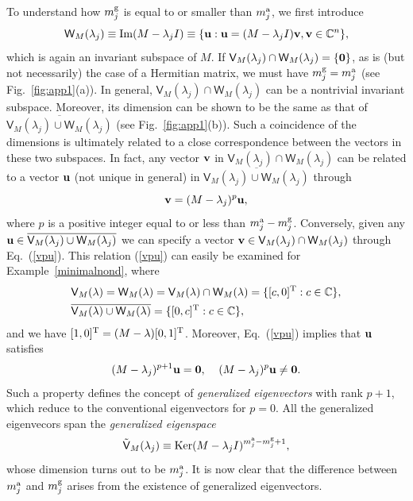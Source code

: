 \documentclass{tADP2e}
\theoremstyle{plain}
\theoremstyle{plain}
\theoremstyle{definition}
\begin{document}
\begin{appendices}
To understand how $m^{\rm g}_j$ is equal to or smaller than $m^{\rm a}_j$, we first introduce
\begin{equation}
\textsf{W}_M(\lambda_j)\equiv{\rm Im}(M-\lambda_jI)\equiv\{\bold{u}:\bold{u}=(M-\lambda_jI)\bold{v},\bold{v}\in\mathbb{C}^n\},
\label{WM}
\end{equation}
which is again an invariant subspace of $M$. If $\textsf{V}_M(\lambda_j)\cap \textsf{W}_M(\lambda_j)=\{\bold{0}\}$, as is (but not necessarily) the case of a Hermitian matrix, we must have $m^{\rm g}_j=m^{\rm a}_j$ (see Fig.~\ref{fig:app1}(a)).  In general, $\textsf{V}_M(\lambda_j)\cap \textsf{W}_M(\lambda_j)$ can be a nontrivial invariant subspace. Moreover, its dimension can be shown to be the same as that of $\overline{\textsf{V}_M(\lambda_j)\cup \textsf{W}_M(\lambda_j)}$ (see Fig.~\ref{fig:app1}(b)). %
Such a coincidence of the dimensions is ultimately related to a close correspondence between the vectors in these two subspaces. In fact, any vector $\bold{v}$ in $\textsf{V}_M(\lambda_j)\cap \textsf{W}_M(\lambda_j)$ can be related to a vector $\bold{u}$ (not unique in general) in $\overline{\textsf{V}_M(\lambda_j)\cup \textsf{W}_M(\lambda_j)}$ through
\begin{equation}
\bold{v}=(M-\lambda_j)^p\bold{u},
\label{vpu}
\end{equation}
where $p$ is a positive integer equal to or less than $m^{\rm a}_j-m^{\rm g}_j$. Conversely, given any $\bold{u}\in \overline{\textsf{V}_M(\lambda_j)\cup \textsf{W}_M(\lambda_j)}$ we can specify a vector $\bold{v}\in \textsf{V}_M(\lambda_j)\cap \textsf{W}_M(\lambda_j)$ through Eq.~(\ref{vpu}). This relation (\ref{vpu}) can easily be examined for Example~\ref{minimalnond}, where 
\begin{equation}
\begin{split}
&\textsf{V}_M(\lambda)=\textsf{W}_M(\lambda)=\textsf{V}_M(\lambda)\cap\textsf{W}_M(\lambda)=\{[c,0]^{\rm T}:c\in\mathbb{C}\}, \\
&\overline{\textsf{V}_M(\lambda)\cup\textsf{W}_M(\lambda)}=\{[0,c]^{\rm T}:c\in\mathbb{C}\},
\end{split}
\end{equation}
and we have $[1,0]^{\rm T}=(M-\lambda)[0,1]^{\rm T}$. Moreover, Eq.~(\ref{vpu}) implies that $\bold{u}$ satisfies
\begin{equation}
(M-\lambda_j)^{p+1}\bold{u}=\bold{0},\;\;\;\;(M-\lambda_j)^p\bold{u}\neq\bold{0}.
\label{gev}
\end{equation}
Such a property defines the concept of \emph{generalized eigenvectors} with rank $p+1$, which reduce to the conventional eigenvectors for $p=0$. All the generalized eigenvecors span the \emph{generalized eigenspace}
\begin{equation}
\tilde{\textsf{V}}_M(\lambda_j)\equiv{\rm Ker}(M-\lambda_j I)^{m^{\rm a}_j-m^{\rm g}_j+1},
\label{tVM}
\end{equation}
whose dimension turns out to be $m^{\rm a}_j$. It is now clear that the difference between $m^{\rm a}_j$ and $m^{\rm g}_j$ arises from the existence of generalized eigenvectors.



\end{appendices}
\end{document}
